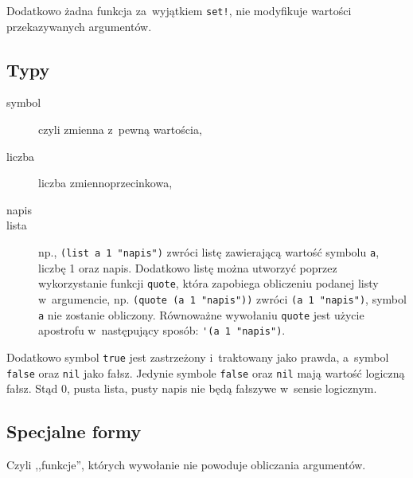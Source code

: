 \documentclass[a4paper,11pt]{article}
\begin{document}
Dodatkowo żadna funkcja za~wyjątkiem \verb+set!+, nie modyfikuje wartości
przekazywanych argumentów.

\subsection{Typy}

\begin{description}
\item[symbol] czyli zmienna z~pewną wartościa,
\item[liczba] liczba zmiennoprzecinkowa,
\item[napis]
\item[lista] np., \verb+(list a 1 "napis")+ zwróci listę zawierającą wartość
  symbolu \verb+a+, liczbę 1 oraz napis. Dodatkowo listę można utworzyć
  poprzez wykorzystanie funkcji \verb+quote+, która zapobiega obliczeniu
  podanej listy w~argumencie, np. \verb+(quote (a 1 "napis"))+ zwróci
  \verb+(a 1 "napis")+, symbol \verb+a+ nie zostanie obliczony. Równoważne
  wywołaniu \verb+quote+ jest użycie apostrofu w~następujący sposób:
  \verb+'(a 1 "napis")+.
\end{description}

Dodatkowo symbol \verb+true+ jest zastrzeżony i~traktowany jako prawda,
a~symbol \verb+false+ oraz \verb+nil+ jako fałsz. Jedynie symbole \verb+false+
oraz \verb+nil+ mają wartość logiczną fałsz. Stąd 0, pusta lista, pusty napis
nie będą fałszywe w~sensie logicznym.

\subsection{Specjalne formy}

Czyli ,,funkcje'', których wywołanie nie powoduje obliczania argumentów.
\end{document}
